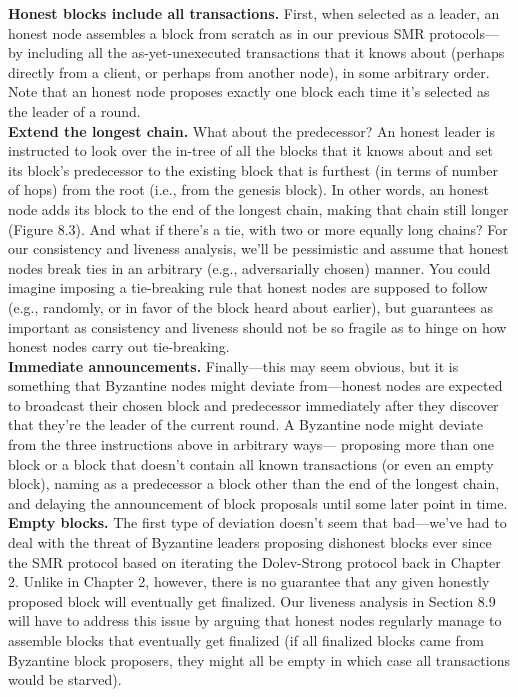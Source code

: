 \noindent
\textbf{Honest blocks include all transactions.} First, when selected as a leader, an honest
node assembles a block from scratch as in our previous SMR protocols—by including all
the as-yet-unexecuted transactions that it knows about (perhaps directly from a client, or
perhaps from another node), in some arbitrary order. Note that an honest node proposes
exactly one block each time it’s selected as the leader of a round.\\

\noindent
\textbf{Extend the longest chain.} What about the predecessor? An honest leader is instructed
to look over the in-tree of all the blocks that it knows about and set its block’s predecessor to
the existing block that is furthest (in terms of number of hops) from the root (i.e., from the
genesis block). In other words, an honest node adds its block to the end of the longest chain,
making that chain still longer (Figure 8.3). And what if there’s a tie, with two or more equally
long chains? For our consistency and liveness analysis, we’ll be pessimistic
and assume that honest nodes break ties in an arbitrary (e.g., adversarially chosen) manner.
You could imagine imposing a tie-breaking rule that honest nodes are supposed to follow
(e.g., randomly, or in favor of the block heard about earlier), but guarantees as important
as consistency and liveness should not be so fragile as to hinge on how honest nodes carry
out tie-breaking.\\

\noindent
\textbf{Immediate announcements.} Finally—this may seem obvious, but it is something that
Byzantine nodes might deviate from—honest nodes are expected to broadcast their chosen
block and predecessor immediately after they discover that they’re the leader of the current
round.
A Byzantine node might deviate from the three instructions above in arbitrary ways—
proposing more than one block or a block that doesn't contain all known transactions (or
even an empty block), naming as a predecessor a block other than the end of the longest
chain, and delaying the announcement of block proposals until some later point in time.\\

\noindent
\textbf{Empty blocks.} The first type of deviation doesn't seem that bad—we've had to deal with
the threat of Byzantine leaders proposing dishonest blocks ever since the SMR protocol based
on iterating the Dolev-Strong protocol back in Chapter 2. Unlike in Chapter 2, however, there
is no guarantee that any given honestly proposed block will eventually get finalized. Our
liveness analysis in Section 8.9 will have to address this issue by arguing that honest nodes
regularly manage to assemble blocks that eventually get finalized (if all finalized blocks came
from Byzantine block proposers, they might all be empty in which case all transactions would
be starved).\\

